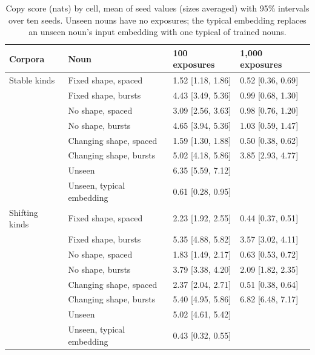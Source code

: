\begin{table}[!htbp]
\centering\small
\caption{Copy score (nats) by cell, mean of seed values (sizes averaged) with 95\% intervals over ten seeds. Unseen nouns have no exposures; the typical embedding replaces an unseen noun's input embedding with one typical of trained nouns.}
\label{tab:N2}
\begin{tabular}{@{}llll@{}}
\toprule
Corpora & Noun & 100 exposures & 1,000 exposures \\
\midrule
Stable kinds & Fixed shape, spaced & 1.52 {[}1.18, 1.86{]} & 0.52 {[}0.36, 0.69{]} \\
 & Fixed shape, bursts & 4.43 {[}3.49, 5.36{]} & 0.99 {[}0.68, 1.30{]} \\
 & No shape, spaced & 3.09 {[}2.56, 3.63{]} & 0.98 {[}0.76, 1.20{]} \\
 & No shape, bursts & 4.65 {[}3.94, 5.36{]} & 1.03 {[}0.59, 1.47{]} \\
 & Changing shape, spaced & 1.59 {[}1.30, 1.88{]} & 0.50 {[}0.38, 0.62{]} \\
 & Changing shape, bursts & 5.02 {[}4.18, 5.86{]} & 3.85 {[}2.93, 4.77{]} \\
 & Unseen & 6.35 {[}5.59, 7.12{]} &  \\
 & Unseen, typical embedding & 0.61 {[}0.28, 0.95{]} &  \\
\midrule
Shifting kinds & Fixed shape, spaced & 2.23 {[}1.92, 2.55{]} & 0.44 {[}0.37, 0.51{]} \\
 & Fixed shape, bursts & 5.35 {[}4.88, 5.82{]} & 3.57 {[}3.02, 4.11{]} \\
 & No shape, spaced & 1.83 {[}1.49, 2.17{]} & 0.63 {[}0.53, 0.72{]} \\
 & No shape, bursts & 3.79 {[}3.38, 4.20{]} & 2.09 {[}1.82, 2.35{]} \\
 & Changing shape, spaced & 2.37 {[}2.04, 2.71{]} & 0.51 {[}0.38, 0.64{]} \\
 & Changing shape, bursts & 5.40 {[}4.95, 5.86{]} & 6.82 {[}6.48, 7.17{]} \\
 & Unseen & 5.02 {[}4.61, 5.42{]} &  \\
 & Unseen, typical embedding & 0.43 {[}0.32, 0.55{]} &  \\
\bottomrule
\end{tabular}
\end{table}

